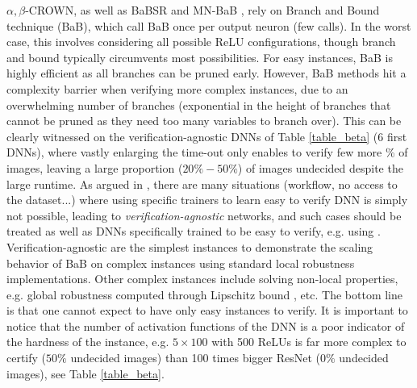 $\alpha,\beta$-CROWN, as well as BaBSR \cite{BaB} and MN-BaB \cite{ferrari2022complete},
rely on Branch and Bound technique (BaB), which call BaB once per output neuron (few calls). In the worst case, this involves considering all possible ReLU configurations, though branch and bound typically circumvents most possibilities. For easy instances, BaB is highly efficient as all branches can be pruned early. However, BaB methods hit a complexity barrier when verifying more complex instances, due to an overwhelming number of branches (exponential in the height of branches that cannot be pruned as they need too many variables to branch over). This can be clearly witnessed on the verification-agnostic \cite{SDPFI} DNNs of Table \ref{table_beta} (6 first DNNs), where vastly enlarging the time-out only enables to verify few more \% of images, leaving a large proportion ($20\%-50\%$) of images undecided despite the large runtime. As argued in \cite{SDPFI}, there are many situations (workflow, no access to the dataset...) where using specific trainers to learn easy to verify DNN is simply not possible, leading to  {\em verification-agnostic} networks, and such cases should be treated as well as DNNs specifically trained to be easy to verify, e.g. using \cite{TrainingforVerification}. Verification-agnostic are the simplest instances to demonstrate the scaling behavior of BaB on complex instances using standard local robustness implementations. Other complex instances include solving non-local properties, e.g. global robustness computed through Lipschitz bound \cite{lipshitz}, etc. The bottom line is that one cannot expect to have only easy instances to verify. It is important to notice that the number of activation functions of the DNN is a poor indicator of the hardness of the instance, e.g. $5 \times 100$ with 500 ReLUs is far more complex to certify ($50\%$ undecided images) than 100 times bigger ResNet ($0\%$ undecided images), see Table \ref{table_beta}.

		
		

